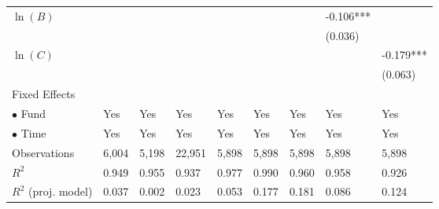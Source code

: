 \documentclass[openany]{book}
\theoremstyle{definition}
\theoremstyle{definition}
\theoremstyle{definition}
\theoremstyle{remark}
\begin{document}
\begin{table}[ht]
\begin{tabularx}{0.975\textwidth}{lYYYYYYYY}
  $\ln(B)$ &  &  &  &  &  &  & -0.106*** &  \\ 
   &  &  &  &  &  &  & (0.036) &  \\ 
  $\ln(C)$ &  &  &  &  &  &  &  & -0.179*** \\ 
   &  &  &  &  &  &  &  & (0.063) \\ 
  Fixed Effects &  &  &  &  &  &  &  &  \\ 
  $\bullet$ Fund & Yes & Yes & Yes & Yes & Yes & Yes & Yes & Yes \\ 
  $\bullet$ Time & Yes & Yes & Yes & Yes & Yes & Yes & Yes & Yes \\ 
  Observations & 6,004 & 5,198 & 22,951 & 5,898 & 5,898 & 5,898 & 5,898 & 5,898 \\ 
  $R^2$ & 0.949 & 0.955 & 0.937 & 0.977 & 0.990 & 0.960 & 0.958 & 0.926 \\ 
  $R^2$ (proj. model) & 0.037 & 0.002 & 0.023 & 0.053 & 0.177 & 0.181 & 0.086 & 0.124 \\ 
   \bottomrule
\end{tabularx}
\endgroup
\end{table}
\end{document}
